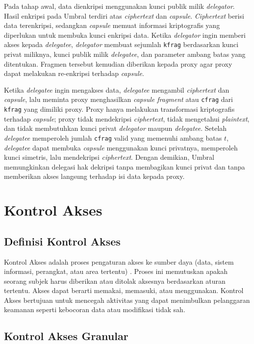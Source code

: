 \documentclass[bahasa, 12pt, a4paper, onecolumn, oneside, final]{report}
\begin{document}
Pada tahap awal, data dienkripsi menggunakan kunci publik milik \textit{delegator}. Hasil enkripsi pada Umbral terdiri atas \textit{ciphertext} dan \textit{capsule}. \textit{Ciphertext} berisi data terenkripsi, sedangkan \textit{capsule} memuat informasi kriptografis yang diperlukan untuk membuka kunci enkripsi data. Ketika \textit{delegator} ingin memberi akses kepada \textit{delegatee}, \textit{delegator} membuat sejumlah \texttt{kfrag} berdasarkan kunci privat miliknya, kunci publik milik \textit{delegatee}, dan parameter ambang batas yang ditentukan. Fragmen tersebut kemudian diberikan kepada proxy agar proxy dapat melakukan re-enkripsi terhadap \textit{capsule}.

Ketika \textit{delegatee} ingin mengakses data, \textit{delegatee} mengambil \textit{ciphertext} dan \textit{capsule}, lalu meminta proxy menghasilkan \textit{capsule fragment} atau \texttt{cfrag} dari \texttt{kfrag} yang dimiliki proxy. Proxy hanya melakukan transformasi kriptografis terhadap \textit{capsule}; proxy tidak mendekripsi \textit{ciphertext}, tidak mengetahui \textit{plaintext}, dan tidak membutuhkan kunci privat \textit{delegator} maupun \textit{delegatee}. Setelah \textit{delegatee} memperoleh jumlah \texttt{cfrag} valid yang memenuhi ambang batas $t$, \textit{delegatee} dapat membuka \textit{capsule} menggunakan kunci privatnya, memperoleh kunci simetris, lalu mendekripsi \textit{ciphertext}. Dengan demikian, Umbral memungkinkan delegasi hak dekripsi tanpa membagikan kunci privat dan tanpa memberikan akses langsung terhadap isi data kepada proxy.
\section{Kontrol Akses}
\label{sec:kontrol-akses}

\subsection{Definisi Kontrol Akses}
\label{subsec:definisi-kontrol-akses}
Kontrol Akses adalah proses pengaturan akses ke sumber daya (data, sistem informasi, perangkat, atau area tertentu) \autocite{sandhu1994access, li2022capability}. Proses ini memutuskan apakah seorang subjek harus diberikan atau ditolak aksesnya berdasarkan aturan tertentu. Akses dapat berarti memakai, memasuki, atau menggunakan. Kontrol Akses bertujuan untuk mencegah aktivitas yang dapat menimbulkan pelanggaran keamanan seperti kebocoran data atau modifikasi tidak sah.

\subsection{Kontrol Akses Granular}
\label{subsec:kontrol-akses-granular}
\end{document}
